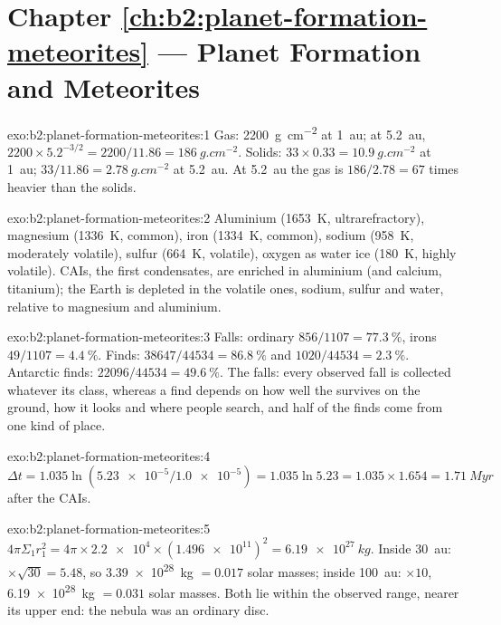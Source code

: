 \section*{Chapter \ref{ch:b2:planet-formation-meteorites} --- Planet Formation and Meteorites}

\begin{solution}{exo:b2:planet-formation-meteorites:1}
Gas: \qty{2200}{g.cm^{-2}} at \qty{1}{au}; at \qty{5.2}{au},
$2200\times5.2^{-3/2} = 2200/11.86 = \qty{186}{g.cm^{-2}}$. Solids:
$33\times0.33 = \qty{10.9}{g.cm^{-2}}$ at \qty{1}{au};
$33/11.86 = \qty{2.78}{g.cm^{-2}}$ at \qty{5.2}{au}. At \qty{5.2}{au} the gas is
$186/2.78 = 67$ times heavier than the solids.
\end{solution}

\begin{solution}{exo:b2:planet-formation-meteorites:2}
Aluminium (\qty{1653}{K}, ultrarefractory), magnesium (\qty{1336}{K}, common),
iron (\qty{1334}{K}, common), sodium (\qty{958}{K}, moderately volatile), sulfur
(\qty{664}{K}, volatile), oxygen as water ice (\qty{180}{K}, highly volatile).
CAIs, the first condensates, are enriched in aluminium (and calcium, titanium);
the Earth is depleted in the volatile ones, sodium, sulfur and water, relative to
magnesium and aluminium.
\end{solution}

\begin{solution}{exo:b2:planet-formation-meteorites:3}
Falls: ordinary  $856/1107 = \qty{77.3}{\percent}$, irons
$49/1107 = \qty{4.4}{\percent}$. Finds: $38647/44534 = \qty{86.8}{\percent}$ and
$1020/44534 = \qty{2.3}{\percent}$. Antarctic finds: $22096/44534 =
\qty{49.6}{\percent}$. The falls: every observed fall is collected whatever its
class, whereas a find depends on how well the  survives on the ground,
how it looks and where people search, and half of the finds come from one kind of
place.
\end{solution}

\begin{solution}{exo:b2:planet-formation-meteorites:4}
$\Delta t = 1.035\ln(\num{5.23e-5}/\num{1.0e-5}) = 1.035\ln 5.23 =
1.035\times1.654 = \qty{1.71}{Myr}$ after the CAIs.
\end{solution}

\begin{solution}{exo:b2:planet-formation-meteorites:5}
$4\pi\Sigma_1 r_1^2 = 4\pi\times\num{2.2e4}\times(\num{1.496e11})^2 =
\qty{6.19e27}{kg}$. Inside \qty{30}{au}: $\times\sqrt{30} = 5.48$, so
\qty{3.39e28}{kg} $= 0.017$ solar masses; inside \qty{100}{au}: $\times10$,
\qty{6.19e28}{kg} $= 0.031$ solar masses. Both lie within the observed range,
nearer its upper end: the nebula was an ordinary disc.
\end{solution}

